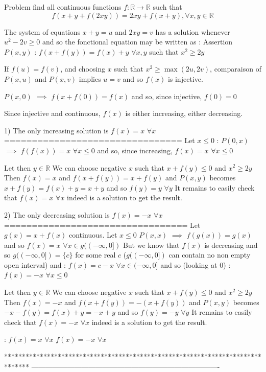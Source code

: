 \begin{solution}
	\begin{tcolorbox}Problem find all continuous functions $f:\mathbb{R}\to\mathbb{R}$ such that
    \[f(x+y+f(2xy))=2xy+f(x+y),\forall x,y\in\mathbb{R}\]\end{tcolorbox}
The system of equations $x+y=u$ and $2xy=v$ has a solution whenever $u^2-2v\ge 0$ and so the fonctional equation may be written as :
Assertion $P(x,y)$ : $f(x+f(y))=f(x)+y$ $\forall x,y$ such that $x^2\ge 2y$

If $f(u)=f(v)$, and choosing $x$ such that $x^2\ge\max(2u,2v)$, comparaison of $P(x,u)$ and $P(x,v)$ implies $u=v$ and so $f(x)$ is injective.

$P(x,0)$ $\implies$ $f(x+f(0))=f(x)$ and so, since injective, $f(0)=0$

Since injective and continuous, $f(x)$ is either increasing, either decreasing.

1) The only increasing solution is $f(x)=x$ $\forall x$
================================
Let $x\le 0$ : $P(0,x)$ $\implies$ $f(f(x))=x$ $\forall x\le 0$ and so, since increasing,  $f(x)=x$ $\forall x\le 0$

Let then $y\in\mathbb R$
We can choose negative $x$ such that $x+f(y)\le 0$ and $x^2\ge 2y$
Then $f(x)=x$ and $f(x+f(y))=x+f(y)$ and $P(x,y)$ becomes $x+f(y)=f(x)+y=x+y$ and so $f(y)=y$ $\forall y$
It remains to easily check that $f(x)=x$ $\forall x$ indeed is a solution to get the result.

2) The only decreasing solution is $f(x)=-x$ $\forall x$
=================================
Let $g(x)=x+f(x)$ continuous.
Let $x\le 0$  $P(x,x)$ $\implies$ $f(g(x))=g(x)$ and so $f(x)=x$ $\forall x\in g((-\infty,0])$
But we know that $f(x)$ is decreasing and so $g((-\infty,0])=\{c\}$ for some real $c$ ($g((-\infty,0])$ can contain no non empty open interval) and :
$f(x)=c-x$ $\forall x\in (-\infty,0]$ and so (looking at $0$) : $f(x)=-x$ $\forall x\le 0$

Let then $y\in\mathbb R$
We can choose negative $x$ such that $x+f(y)\le 0$ and $x^2\ge 2y$
Then $f(x)=-x$ and $f(x+f(y))=-(x+f(y))$ and $P(x,y)$ becomes $-x-f(y)=f(x)+y=-x+y$ and so $f(y)=-y$ $\forall y$
It remains to easily check that $f(x)=-x$ $\forall x$ indeed is a solution to get the result.

 :
$f(x)=x$ $\forall x$
$f(x)=-x$ $\forall x$
\end{solution}
*******************************************************************************
-------------------------------------------------------------------------------

